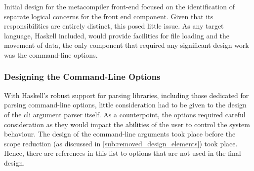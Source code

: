 Initial design for the metacompiler front-end focused on the identification of separate logical concerns for the front end component.
Given that its responsibilities are entirely distinct, this posed little issue.
As any target language, Haskell included, would provide facilities for file loading and the movement of data, the only component that required any significant design work was the command-line options. 

\subsubsection{Designing the Command-Line Options} %
\label{ssub:designing_the_command_line_options}
With Haskell's robust support for parsing libraries, including those dedicated for parsing command-line options, little consideration had to be given to the design of the \gls{cli} argument parser itself.
As a counterpoint, the options required careful consideration as they would impact the abilities of the user to control the system behaviour. 
The design of the command-line arguments took place before the scope reduction (as discussed in \autoref{sub:removed_design_elements}) took place.
Hence, there are references in this list to options that are not used in the final design.\\

